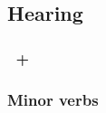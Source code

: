 \subsection{Hearing}

\subsubsection{}

\subsubsection{}

\subsubsection{~+ }

\subsubsection{Minor verbs}

 
